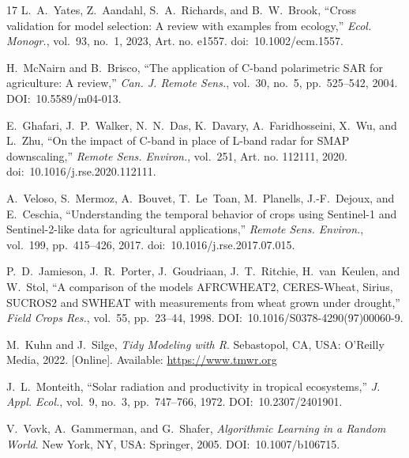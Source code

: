 \documentclass[lettersize,journal]{IEEEtran}
\begin{document}
\begin{thebibliography}{17}
L.~A.~Yates, Z.~Aandahl, S.~A.~Richards, and B.~W.~Brook,
``Cross validation for model selection: A review with examples from
ecology,''
\textit{Ecol. Monogr.}, vol.~93, no.~1, 2023, Art. no. e1557.
doi:~10.1002/ecm.1557.

H.~McNairn and B.~Brisco, ``The application of C-band polarimetric SAR
for agriculture: A review,'' \textit{Can. J. Remote Sens.}, vol.~30,
no.~5, pp.~525--542, 2004. DOI:~10.5589/m04-013.

E.~Ghafari, J.~P.~Walker, N.~N.~Das, K.~Davary, A.~Faridhosseini,
X.~Wu, and L.~Zhu,
``On the impact of {C}-band in place of {L}-band radar for {SMAP}
downscaling,''
\textit{Remote Sens. Environ.}, vol.~251, Art. no. 112111, 2020.
doi:~10.1016/j.rse.2020.112111.

A.~Veloso, S.~Mermoz, A.~Bouvet, T.~Le~Toan, M.~Planells,
J.-F.~Dejoux, and E.~Ceschia,
``Understanding the temporal behavior of crops using {Sentinel-1} and
{Sentinel-2}-like data for agricultural applications,''
\textit{Remote Sens. Environ.}, vol.~199, pp.~415--426, 2017.
doi:~10.1016/j.rse.2017.07.015.

P.~D.~Jamieson, J.~R.~Porter, J.~Goudriaan, J.~T.~Ritchie, H.~van~Keulen,
and W.~Stol, ``A comparison of the models AFRCWHEAT2, CERES-Wheat, Sirius,
SUCROS2 and SWHEAT with measurements from wheat grown under drought,''
\textit{Field Crops Res.}, vol.~55, pp.~23--44, 1998.
DOI:~10.1016/S0378-4290(97)00060-9.

M.~Kuhn and J.~Silge, \textit{Tidy Modeling with R}.
Sebastopol, CA, USA: O'Reilly Media, 2022. [Online].
Available: \url{https://www.tmwr.org}

J.~L.~Monteith, ``Solar radiation and productivity in tropical ecosystems,''
\textit{J. Appl. Ecol.}, vol.~9, no.~3, pp.~747--766, 1972.
DOI:~10.2307/2401901.

V.~Vovk, A.~Gammerman, and G.~Shafer,
\textit{Algorithmic Learning in a Random World}.
New York, NY, USA: Springer, 2005. DOI:~10.1007/b106715.

\end{thebibliography}




\vfill
\end{document}
